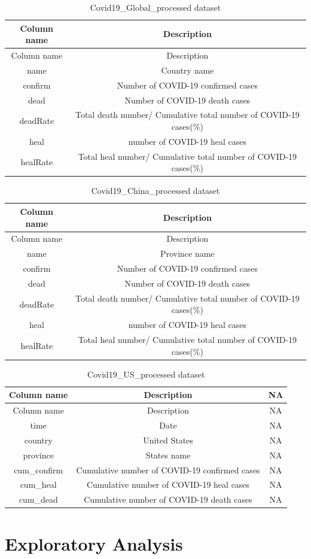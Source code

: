\documentclass[12pt,]{article}
\begin{document}
\begin{longtable}[]{@{}cc@{}}
\caption{Covid19\_Global\_processed dataset}\tabularnewline
\toprule
Column name & Description\tabularnewline
\midrule
\endfirsthead
\toprule
Column name & Description\tabularnewline
\midrule
\endhead
name & Country name\tabularnewline
confirm & Number of COVID-19 confirmed cases\tabularnewline
dead & Number of COVID-19 death cases\tabularnewline
deadRate & Total death number/ Cumulative total number of COVID-19
cases(\%)\tabularnewline
heal & number of COVID-19 heal cases\tabularnewline
healRate & Total heal number/ Cumulative total number of COVID-19
cases(\%)\tabularnewline
\bottomrule
\end{longtable}

\begin{longtable}[]{@{}cc@{}}
\caption{Covid19\_China\_processed dataset}\tabularnewline
\toprule
Column name & Description\tabularnewline
\midrule
\endfirsthead
\toprule
Column name & Description\tabularnewline
\midrule
\endhead
name & Province name\tabularnewline
confirm & Number of COVID-19 confirmed cases\tabularnewline
dead & Number of COVID-19 death cases\tabularnewline
deadRate & Total death number/ Cumulative total number of COVID-19
cases(\%)\tabularnewline
heal & number of COVID-19 heal cases\tabularnewline
healRate & Total heal number/ Cumulative total number of COVID-19
cases(\%)\tabularnewline
\bottomrule
\end{longtable}

\begin{longtable}[]{@{}ccc@{}}
\caption{Covid19\_US\_processed dataset}\tabularnewline
\toprule
Column name & Description & NA\tabularnewline
\midrule
\endfirsthead
\toprule
Column name & Description & NA\tabularnewline
\midrule
\endhead
time & Date & NA\tabularnewline
country & United States & NA\tabularnewline
province & States name & NA\tabularnewline
cum\_confirm & Cumulative number of COVID-19 confirmed cases &
NA\tabularnewline
cum\_heal & Cumulative number of COVID-19 heal cases & NA\tabularnewline
cum\_dead & Cumulative number of COVID-19 death cases &
NA\tabularnewline
\bottomrule
\end{longtable}

\newpage

\hypertarget{exploratory-analysis}{%
\section{Exploratory Analysis}\label{exploratory-analysis}}
\end{document}
